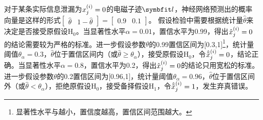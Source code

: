 {{	
	\begin{example}
		对于某条实际信息泄漏为$x^{(i)}_j=0$的电磁子迹$\Vector l$，神经网络预测出的概率向量是这样的形式$\begin{bmatrix}\hat\theta&1-\hat\theta\end{bmatrix}=\begin{bmatrix}0.9&0.1\end{bmatrix}$。%
		假设检验中需要根据统计量$\hat\theta$来决定是否接受原假设$\mathrm H_0$。当显著性水平$\alpha=0.01$，置信水平为0.99，得出$\hat{x}^{(i)}_j=0$的结论需要较为严格的标准。进一步假设参数$\theta$的0.99置信区间为[0.3,1]\footnote{显著性水平与越小，置信度越高，置信区间范围越大。}，统计量阈值$\theta_{\alpha}=0.3$，$\hat\theta$位于置信区间内（或$\hat\theta\ge\theta_{\alpha}$），接受原假设$\mathrm H_0$，令$\hat {\tilde{x}}^{(i)}_j=0$，结论正确。当显著性水平$\alpha=0.8$，置信水平为0.2，得出$\hat{x}^{(i)}_j=0$的结论只用宽松的标准。进一步假设参数$\theta$的0.2置信区间为[0.96,1]，统计量阈值$\theta_{\alpha}=0.96$，$\hat\theta$位于置信区间外（或$\hat\theta<\theta_{\alpha}$），拒绝原假设$\mathrm H_0$，接受备择假设$\mathrm H_1$，令$\hat {\tilde{x}}^{(i)}_j=1$，发生弃真错误。
	\end{example}
	


}}

